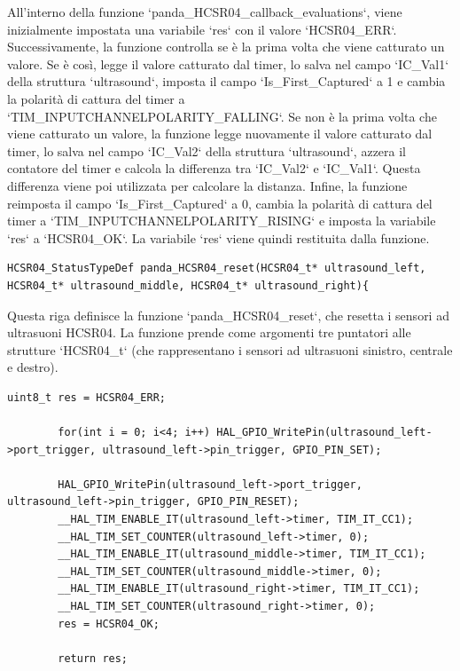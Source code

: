 \documentclass{article}
\begin{document}
      All'interno della funzione `panda\_HCSR04\_callback\_evaluations`, viene inizialmente impostata una variabile `res` con il valore `HCSR04\_ERR`. Successivamente, la funzione controlla se è la prima volta che viene catturato un valore. Se è così, legge il valore catturato dal timer, lo salva nel campo `IC\_Val1` della struttura `ultrasound`, imposta il campo `Is\_First\_Captured` a 1 e cambia la polarità di cattura del timer a `TIM\_INPUTCHANNELPOLARITY\_FALLING`. Se non è la prima volta che viene catturato un valore, la funzione legge nuovamente il valore catturato dal timer, lo salva nel campo `IC\_Val2` della struttura `ultrasound`, azzera il contatore del timer e calcola la differenza tra `IC\_Val2` e `IC\_Val1`. Questa differenza viene poi utilizzata per calcolare la distanza. Infine, la funzione reimposta il campo `Is\_First\_Captured` a 0, cambia la polarità di cattura del timer a `TIM\_INPUTCHANNELPOLARITY\_RISING` e imposta la variabile `res` a `HCSR04\_OK`. La variabile `res` viene quindi restituita dalla funzione.
      
      \begin{lstlisting}[style=CStyle]
      HCSR04_StatusTypeDef panda_HCSR04_reset(HCSR04_t* ultrasound_left, HCSR04_t* ultrasound_middle, HCSR04_t* ultrasound_right){
      \end{lstlisting}
      
      Questa riga definisce la funzione `panda\_HCSR04\_reset`, che resetta i sensori ad ultrasuoni HCSR04. La funzione prende come argomenti tre puntatori alle strutture `HCSR04\_t` (che rappresentano i sensori ad ultrasuoni sinistro, centrale e destro).
      
      \begin{lstlisting}[style=CStyle]
        uint8_t res = HCSR04_ERR;
      
        for(int i = 0; i<4; i++) HAL_GPIO_WritePin(ultrasound_left->port_trigger, ultrasound_left->pin_trigger, GPIO_PIN_SET);
      
        HAL_GPIO_WritePin(ultrasound_left->port_trigger, ultrasound_left->pin_trigger, GPIO_PIN_RESET);
        __HAL_TIM_ENABLE_IT(ultrasound_left->timer, TIM_IT_CC1);
        __HAL_TIM_SET_COUNTER(ultrasound_left->timer, 0);
        __HAL_TIM_ENABLE_IT(ultrasound_middle->timer, TIM_IT_CC1);
        __HAL_TIM_SET_COUNTER(ultrasound_middle->timer, 0);
        __HAL_TIM_ENABLE_IT(ultrasound_right->timer, TIM_IT_CC1);
        __HAL_TIM_SET_COUNTER(ultrasound_right->timer, 0);
        res = HCSR04_OK;
      
        return res;
      \end{lstlisting}
      
\end{document}
